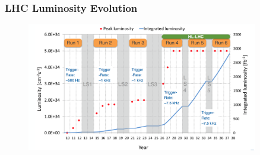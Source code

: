 \begin{frame}
\frametitle{LHC Luminosity Evolution}

\begin{figure}[htbp]
\begin{center}
\includegraphics[width=0.9\textwidth]{images/lhc-lumi-evolution.png}
\end{center}
\end{figure}


\end{frame}


